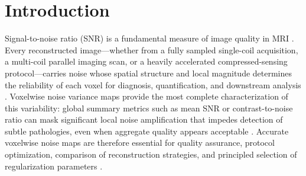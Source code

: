 \documentclass[AMA,STIX2COL,Linenumberson]{MRM}
\begin{document}



\maketitle

\section{Introduction}
\label{sec:intro}

Signal-to-noise ratio (SNR) is a fundamental measure 
of image quality in MRI \cite{macovski_noise,roemer1990nmr,noise_influence}. Every 
reconstructed image---whether from a fully sampled single-coil 
acquisition, a multi-coil parallel imaging scan, or a 
heavily accelerated compressed-sensing protocol---carries
noise whose spatial structure and local magnitude determines 
the reliability of each voxel for diagnosis, quantification, 
and downstream analysis \cite{SNR_measure,image_recon_SNR}. Voxelwise noise variance maps 
provide the most complete characterization of this 
variability: global summary metrics such as mean SNR or 
contrast-to-noise ratio can mask significant local noise 
amplification that impedes detection of subtle pathologies, 
even when aggregate quality appears acceptable 
\cite{Rubenstein1997,Lerski1993}. Accurate 
voxelwise noise maps are therefore essential for quality 
assurance, protocol optimization, comparison of 
reconstruction strategies, and principled selection of 
regularization parameters 
\cite{image_recon_SNR,Kiryu2023,Knoll2020}.

\end{document}
